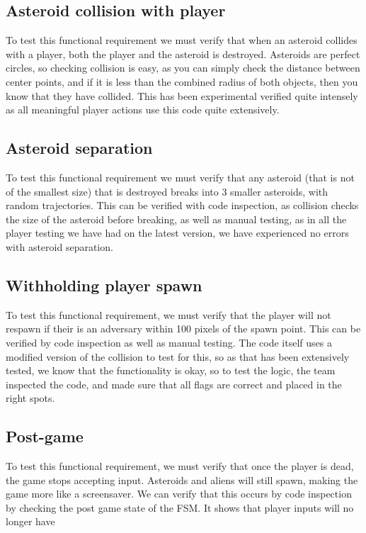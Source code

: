 \documentclass[12pt, titlepage]{article}
\begin{document}
\subsection{Asteroid collision with player}
To test this functional requirement we must verify that when an asteroid collides with a player, both the player and the asteroid is destroyed. Asteroids are perfect circles, so checking collision is easy, as you can simply check the distance between center points, and if it is less than the combined radius of both objects, then you know that they have collided. This has been experimental verified quite intensely as all meaningful player actions use this code quite extensively.\\
\subsection{Asteroid separation}
To test this functional requirement we must verify that any asteroid (that is not of the smallest size) that is destroyed breaks into 3 smaller asteroids, with random trajectories. This can be verified with code inspection, as collision checks the size of the asteroid before breaking, as well as manual testing, as in all the player testing we have had on the latest version, we have experienced no errors with asteroid separation.
\subsection{Withholding player spawn}
To test this functional requirement, we must verify that the player will not respawn if their is an adversary within 100 pixels of the spawn point. This can be verified by code inspection as well as manual testing. The code itself uses a modified version of the collision to test for this, so as that has been extensively tested, we know that the functionality is okay, so to test the logic, the team inspected the code, and made sure that all flags are correct and placed in the right spots.
\subsection{Post-game}
To test this functional requirement, we must verify that once the player is dead, the game stops accepting input. Asteroids and aliens will still spawn, making the game more like a screensaver. We can verify that this occurs by code inspection by checking the post game state of the FSM. It shows that player inputs will no longer have
\end{document}
